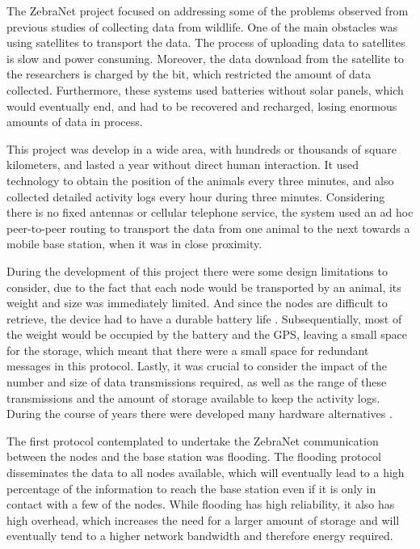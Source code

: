 The ZebraNet project focused on addressing some of the problems observed from previous
studies of collecting data from wildlife. One of the main obstacles was using
satellites to transport the data. The process of uploading data to satellites is slow and
power consuming. Moreover, the data download from the satellite to the researchers is
charged by the bit, which restricted the amount of data collected. Furthermore, these
systems used batteries without solar panels, which would eventually end, and had to be
recovered and recharged, losing enormous amounts of data in process.

This project was develop in a wide area, with hundreds or thousands of square kilometers,
and lasted a year without direct human interaction. It used  technology to
obtain the position of the animals every three minutes, and also collected detailed activity
logs every hour during three minutes. Considering there is no fixed antennas or cellular
telephone service, the system used an ad hoc peer-to-peer routing to transport the data from
one animal to the next towards a mobile base station, when it was in close proximity.

During the development of this project there were some design limitations to consider, due to
the fact that each node would be transported by an animal, its weight and size was immediately
limited. And since the nodes are difficult to retrieve, the device had to have a durable
battery life \cite{Zhang2004}. Subsequentially, most of the weight would be occupied by the
battery and the GPS, leaving a small space for the storage, which meant that there were a
small space for redundant messages in this protocol. Lastly, it was crucial to consider the
impact of the number and size of data transmissions required, as well as the range of these
transmissions and the amount of storage available to keep the activity logs.
During the course of years there were developed many hardware alternatives \cite{Zhang2004}.

The first protocol contemplated to undertake the ZebraNet communication between the nodes and
the base station was flooding. The flooding protocol disseminates the data to all nodes
available, which will eventually lead to a high percentage of the information to reach the
base station even if it is only in contact with a few of the nodes. While flooding has high
reliability, it also has high overhead, which increases the need for a larger amount of
storage and will eventually tend to a higher network bandwidth and therefore energy required.

